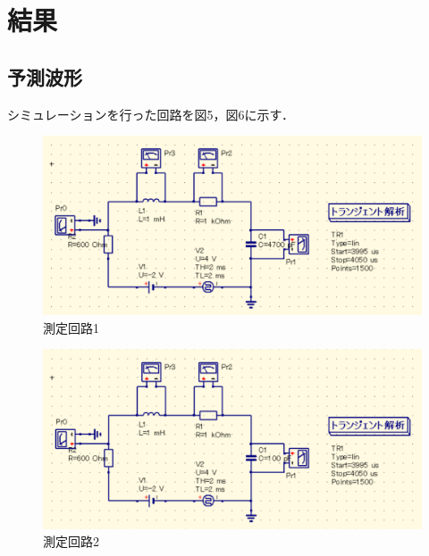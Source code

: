
\section{結果}

\subsection{予測波形}
シミュレーションを行った回路を図5，図6に示す．
\begin{figure}[H]
    \begin{center}
        \includegraphics[keepaspectratio, scale=0.7]{circuit1.pdf}
        \caption{測定回路1}
    \end{center}
\end{figure}

\begin{figure}[H]
    \begin{center}
        \includegraphics[keepaspectratio, scale=0.7]{circuit2.pdf}
        \caption{測定回路2}
    \end{center}
\end{figure}

